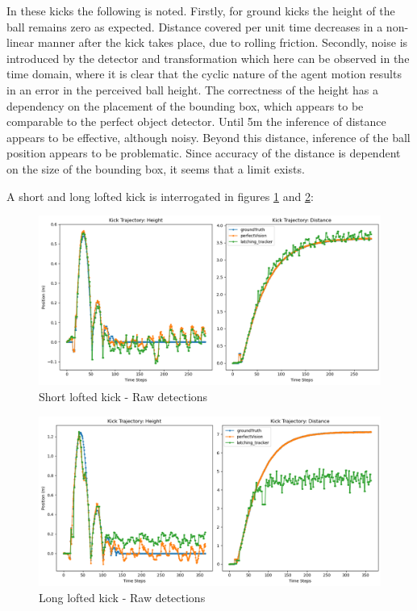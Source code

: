 \documentclass[a4paper,twoside,12pt]{report}
\begin{document}
In these kicks the following is noted. Firstly, for ground kicks the height of the ball remains zero as expected. Distance covered per unit time decreases in a non-linear manner after the kick takes place, due to rolling friction. Secondly, noise is introduced by the detector and transformation which here can be observed in the time domain, where it is clear that the cyclic nature of the agent motion results in an error in the perceived ball height. The correctness of the height has a dependency on the placement of the bounding box, which appears to be comparable to the perfect object detector. Until 5m the inference of distance appears to be effective, although noisy. Beyond this distance, inference of the ball position appears to be problematic. Since accuracy of the distance is dependent on the size of the bounding box, it seems that a limit exists.

A short and long lofted kick is interrogated in figures \ref{fig:rawloftshort} and \ref{fig:rawloftlong}:

\begin{figure}[h!]
\begin{center}
\includegraphics[width=12cm]{images/raw_loft_short.png}
\caption{Short lofted kick - Raw detections}
\label{fig:rawloftshort}
\end{center}
\end{figure}

\begin{figure}[h!]
\begin{center}
\includegraphics[width=12cm]{images/raw_loft_long.png}
\caption{Long lofted kick - Raw detections}
\label{fig:rawloftlong}
\end{center}
\end{figure}
\end{document}
